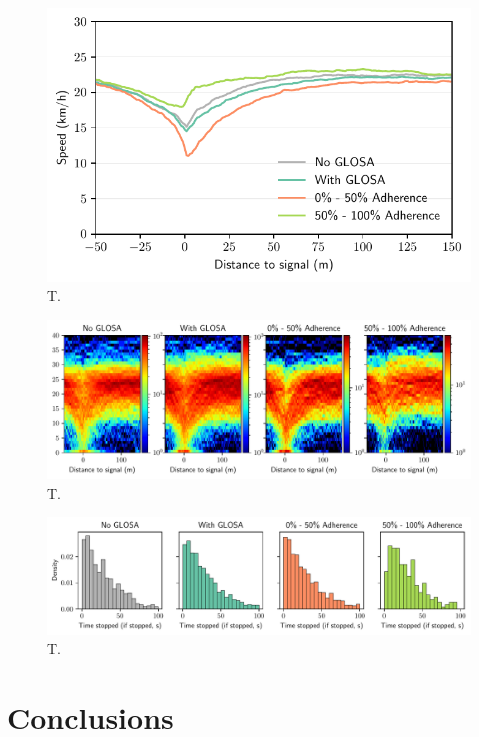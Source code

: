 \begin{figure}[t]
\caption{T.}\label{fig:}
\includegraphics[width=\linewidth]{images/impacts-approach-speed.pdf}
\end{figure}

\begin{figure}[t]
\caption{T.}\label{fig:}
\includegraphics[width=\linewidth]{images/impacts-approach-speed-heatmap.pdf}
\end{figure}

\begin{figure}[t]
\caption{T.}\label{fig:}
\includegraphics[width=\linewidth]{images/impacts-stop-time-adherence.pdf}
\end{figure}

\section{Conclusions}
